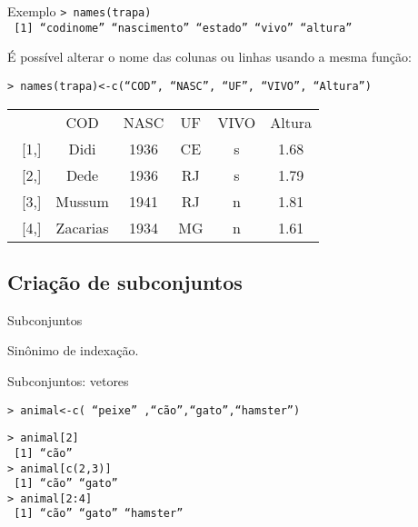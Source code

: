 \documentclass{beamer}
\begin{document}
\begin{frame}{Exemplo}
\texttt{> names(trapa)\\
~[1]  ``codinome''   ``nascimento'' ``estado''   ``vivo''  ``altura''}\vspace{10pt}

É possível alterar o nome das colunas ou linhas usando a mesma função:\\ \vspace{10pt}

\texttt{> names(trapa)<-c(``COD'', ``NASC'', ``UF'', ``VIVO'', ``Altura'')}

\begin{table}[!h]  
 \begin{tabular}{ cccccc} 
 & COD & NASC & UF & VIVO & Altura \\ 
~[1,] & Didi & 1936 & CE & s & 1.68 \\ 
~[2,] & Dede & 1936 & RJ & s & 1.79 \\ 
~[3,] & Mussum & 1941 & RJ & n & 1.81 \\ 
~[4,] & Zacarias & 1934 & MG & n & 1.61 \\ 
\end{tabular} 
\end{table}
\end{frame}

\subsection{Criação de subconjuntos}
\begin{frame}{Subconjuntos}
\centering
{}
\pause

Sinônimo de indexação.  
\end{frame}

\begin{frame}{Subconjuntos: vetores}

  \begin{center}
     
  \end{center}


\texttt{> animal<-c( ``peixe'' ,``cão'',``gato'',``hamster'')}  
\pause

\texttt{> animal[2]\\
~[1] ``cão''\\ \pause
> animal[c(2,3)]\\
~[1] ``cão''  ``gato''\\
> animal[2:4]\\
~[1] ``cão''     ``gato''    ``hamster''}
\end{frame}
\end{document}

